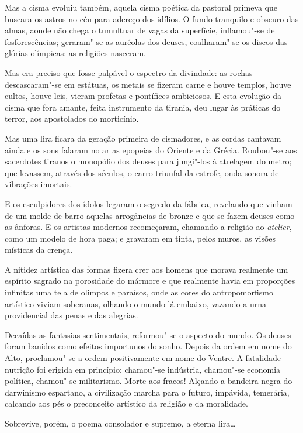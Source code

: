 Mas a cisma evoluiu também, aquela cisma
poética da pastoral primeva que buscara os astros no céu para adereço
dos idílios. O fundo tranquilo e obscuro das almas, aonde não chega o
tumultuar de vagas da superfície, inflamou"-se de fosforescências;
geraram"-se as auréolas dos deuses, coalharam"-se os discos das
glórias olímpicas: as religiões nasceram. 

Mas era preciso que fosse
palpável o espectro da divindade: as rochas descascaram"-se em
estátuas, os metais se fizeram carne e houve templos, houve cultos,
houve leis, vieram profetas e pontífices ambiciosos. E esta evolução da
cisma que fora amante, feita instrumento da tirania, deu lugar às
práticas do terror, aos apostolados do morticínio. 

Mas uma lira ficara
da geração primeira de cismadores, e as cordas cantavam ainda e os sons
falaram no ar as epopeias do Oriente e da Grécia. Roubou"-se aos
sacerdotes tiranos o monopólio dos deuses para jungi"-los à atrelagem
do metro; que levassem, através dos séculos, o carro triunfal da
estrofe, onda sonora de vibrações imortais. 

E os esculpidores dos
ídolos legaram o segredo da fábrica, revelando que vinham de um molde
de barro aquelas arrogâncias de bronze e que se fazem deuses como as
ânforas. E os artistas modernos recomeçaram, chamando a religião ao
\textit{atelier}, como um modelo de hora paga; e gravaram em tinta, pelos muros,
as visões místicas da crença. 

A nitidez artística das formas fizera
crer aos homens que morava realmente um espírito sagrado na porosidade
do mármore e que realmente havia em proporções infinitas uma tela de
olimpos e paraísos, onde as cores do antropomorfismo artístico viviam
soberanas, olhando o mundo lá embaixo, vazando a urna providencial das
penas e das alegrias. 

Decaídas as fantasias sentimentais, reformou"-se
o aspecto do mundo. Os deuses foram banidos como efeitos importunos do
sonho. Depois da ordem em nome do Alto, proclamou"-se a ordem
positivamente em nome do Ventre. A fatalidade nutrição foi erigida em
princípio: chamou"-se indústria, chamou"-se economia política,
chamou"-se militarismo. Morte aos fracos! Alçando a bandeira negra do
darwinismo espartano, a civilização marcha para o futuro, impávida,
temerária, calcando aos pés o preconceito artístico da religião e da
moralidade. 

Sobrevive, porém, o poema consolador e supremo, a eterna
lira\ldots{} 

